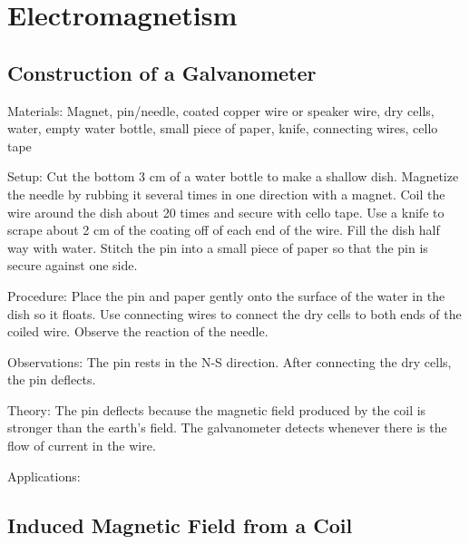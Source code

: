 \section{Electromagnetism}

\begin{multicols}{2}


\subsection{Construction of a Galvanometer} %


\begin{description*}
\item[Materials:]{Magnet, pin/needle, coated copper wire or speaker wire, dry cells, water, empty water bottle, small piece of paper, knife, connecting wires, cello tape}
\item[Setup:]{Cut the bottom 3 cm of a water bottle to make a shallow dish. Magnetize the needle by rubbing it several times in one direction with a magnet. Coil the wire around the dish about 20 times and secure with cello tape. Use a knife to scrape about 2 cm of the coating off of each end of the wire. Fill the dish half way with water. Stitch the pin into a small piece of paper so that the pin is secure against one side.}
\item[Procedure:]{ Place the pin and paper gently onto the surface of the water in the dish so it floats. Use connecting wires to connect the dry cells to both ends of the coiled wire. Observe the reaction of the needle.}
\item[Observations:]{The pin rests in the N-S direction. After connecting the dry cells, the pin deflects.}
\item[Theory:]{The pin deflects because the magnetic field produced by the coil is stronger than the earth's field. The galvanometer detects whenever there is the flow of current in the wire.}
\item[Applications:]{}
\end{description*}

\subsection{Induced Magnetic Field from a Coil}


\end{multicols}
